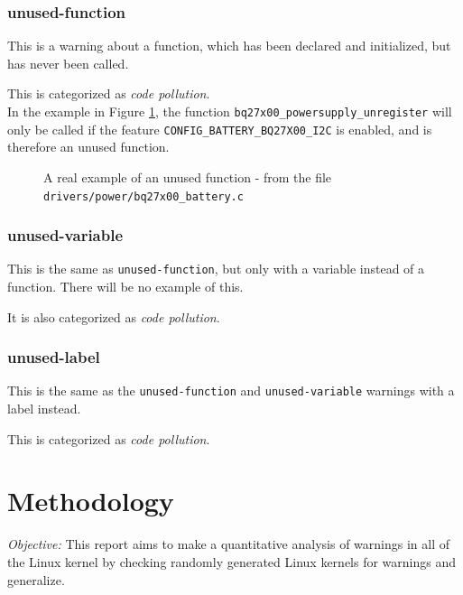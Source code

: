 \documentclass[a4paper,11pt]{report}
\newcommand{\figa}{
    \begin{figure}[!htpb]
    \centering
}
\newcommand{\figb}[2]{
    \caption{#1}
    \label{#2}
    \end{figure}
}
\begin{document}
            \subsection*{unused-function}
This is a warning about a function, which has been declared and initialized, 
but has never been called. 

This is categorized as \emph{code pollution}.
\\

In the example in Figure \ref{lst:unusedfuncreal}, the function 
\texttt{bq27x00\_powersupply\_unregister} will only be called if the feature 
\texttt{CONFIG\_BATTERY\_BQ27X00\_I2C} is enabled, and is therefore an 
unused function.

\figa
    
\figb{A real example of an unused function - from the file 
    \texttt{drivers/power/bq27x00\_battery.c}}{lst:unusedfuncreal}


            \subsection*{unused-variable}
This is the same as \texttt{unused-function}, but only with a variable instead 
of a function. There will be no example of this.

It is also categorized as \emph{code pollution}.


            \subsection*{unused-label}
This is the same as the \texttt{unused-function} and \texttt{unused-variable} 
warnings with a label instead.

This is categorized as \emph{code pollution}.




\newpage
\chapter{Methodology}

\emph{Objective:}
This report aims to make a quantitative analysis of warnings in all of the
Linux kernel by checking randomly generated Linux kernels for warnings and 
generalize.
\end{document}
